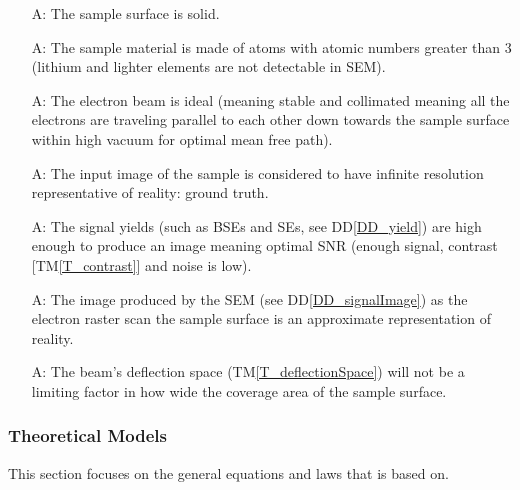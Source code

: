 \documentclass[12pt]{article}
\newcommand{\ddref}[1]{DD\ref{#1}}
\newcommand{\tref}[1]{TM\ref{#1}}
\newcounter{assumpnum} %
\begin{document}
\begin{itemize}

\item[A\refstepcounter{assumpnum}\theassumpnum \label{A_sampleSolid}:] The sample 
surface is solid.

\item[A\refstepcounter{assumpnum}\theassumpnum \label{A_sampleZ}:] The sample 
material is made of atoms with atomic numbers greater than 3 (lithium and lighter elements are not detectable in SEM).

\item[A\refstepcounter{assumpnum}\theassumpnum \label{A_beam}:] The electron 
beam is ideal (meaning stable and collimated meaning all the electrons are 
traveling parallel to each other down towards the sample surface within high 
vacuum for optimal mean free path).

\item[A\refstepcounter{assumpnum}\theassumpnum \label{A_inputImage}:] The input 
image of the sample is considered to have infinite resolution representative of reality: ground truth.

\item[A\refstepcounter{assumpnum}\theassumpnum \label{A_yield}:] The signal yields (such as BSEs and SEs, see \ddref{DD_yield})
are high enough to produce an image meaning optimal SNR (enough signal, 
contrast [\tref{T_contrast}] and noise is low).

\item[A\refstepcounter{assumpnum}\theassumpnum \label{A_reality}:] The image 
produced by the SEM (see \ddref{DD_signalImage}) as the electron raster scan the sample surface is an 
approximate representation of reality.

\item[A\refstepcounter{assumpnum}\theassumpnum \label{A_deflectionLimit}:] The beam's deflection 
space (\tref{T_deflectionSpace}) will not be a limiting factor in how wide the coverage area 
of the sample surface.

\end{itemize}

\subsubsection{Theoretical Models}\label{sec_theoretical}

This section focuses on the general equations and laws that \progname{} is based
on.
~\newline
\end{document}
